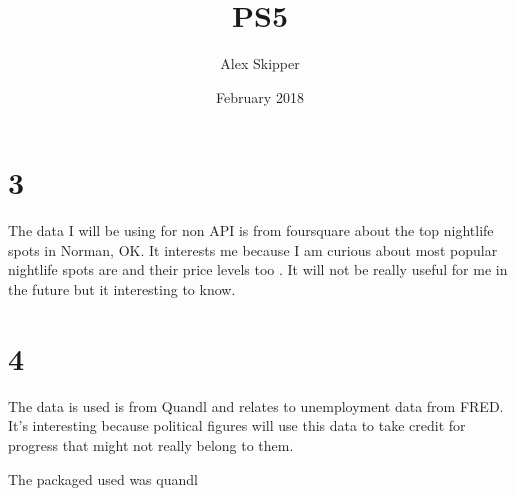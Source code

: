 \documentclass{article}
\title{PS5}
\author{Alex Skipper }
\date{February 2018}
\begin{document}
\maketitle

\section{3}
The data I will be using for non API is from foursquare about the top nightlife spots in Norman, OK. It interests me because I am curious about most popular nightlife spots are and their price levels too . It will not be really useful for me in the future but it interesting to know. 

\section{4}
The data is used is from Quandl and relates to unemployment data from FRED. It's interesting because political figures will use this data to take credit for progress that might not really belong to them. 

The packaged used was quandl
\end{document}
